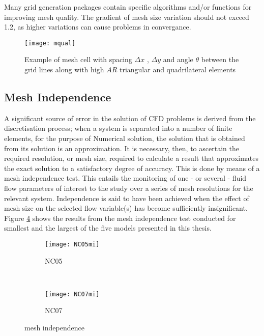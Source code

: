 Many grid generation packages contain specific algorithms and/or functions for improving mesh quality. The gradient of mesh size variation should not exceed 1.2, as higher variations can cause problems in convergance.

\begin{figure}
  \texttt{[image: mqual]}
  \caption{Example of mesh cell with spacing $\Delta x$ , $\Delta y$ and angle $ \theta $ between the grid lines along with high $AR$ triangular and quadrilateral elements } \label{fig:mqual}
\end{figure}
 
\subsection{Mesh Independence}

A significant source of error in the solution of CFD problems is derived from the discretisation process; when a system is separated into a number of finite elements, for the purpose of Numerical solution, the solution that is obtained from its solution is an approximation. It is necessary, then, to ascertain the required resolution, or mesh size, required to calculate a result that approximates the exact solution to a satisfactory degree of accuracy. This is done by means of a mesh independence test. This entails the monitoring of one - or several - fluid flow parameters of interest to the study over a series of mesh resolutions for the relevant system. Independence is said to have been achieved when the effect of mesh size on the selected flow variable(s) has become sufficiently insignificant. Figure \ref{fig:mind} shows the results from the mesh independence test conducted for smallest and the largest of the five models presented in this thesis.

\begin{figure}

  \begin{subfigure}[t]{0.5\textwidth}
    \texttt{[image: NC05mi]}
    \caption{NC05}
    \label{fig:mi5}
  \end{subfigure}%
  ~%
  \begin{subfigure}[t]{0.5\textwidth}
    \texttt{[image: NC07mi]}
    \caption{NC07}
    \label{fig:mi7}
  \end{subfigure}
  \caption{mesh independence} \label{fig:mind}

\end{figure} 

